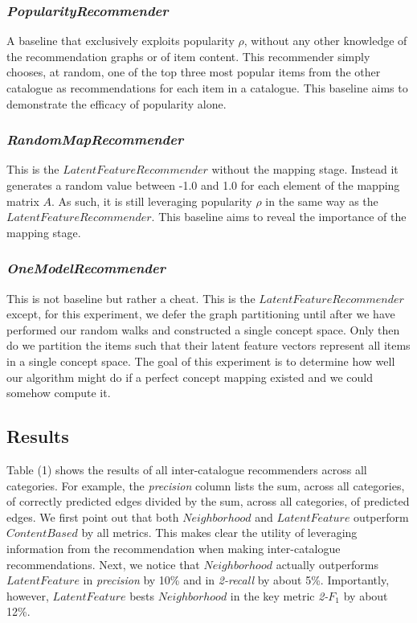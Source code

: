 \documentclass[11pt]{article}
\begin{document}
\subsubsection*{\em PopularityRecommender}
A baseline that exclusively exploits popularity $\rho$, without any other
knowledge of the recommendation graphs or of item content. This recommender
simply chooses, at random, one of the top three most popular items from the
other catalogue as recommendations for each item in a catalogue. This baseline
aims to demonstrate the efficacy of popularity alone.

\subsubsection*{\em RandomMapRecommender}
This is the $LatentFeatureRecommender$ without the mapping stage. Instead it
generates a random value between -1.0 and 1.0 for each element of the mapping
matrix $A$. As such, it is still leveraging popularity $\rho$ in the same way as
the $LatentFeatureRecommender$. This baseline aims to reveal the importance of
the mapping stage.

\subsubsection*{\em OneModelRecommender}
This is not baseline but rather a cheat. This is the $LatentFeatureRecommender$
except, for this experiment, we defer the graph partitioning until after we have
performed our random walks and constructed a single concept space. Only then do
we partition the items such that their latent feature vectors represent all
items in a single concept space. The goal of this experiment is to determine how
well our algorithm might do if a perfect concept mapping existed and we could
somehow compute it.

\pagebreak
\subsection*{Results}
Table (1) shows the results of all inter-catalogue recommenders across all
categories. For example, the {\em precision} column lists the sum, across all
categories, of correctly predicted edges divided by the sum, across all
categories, of predicted edges. We first point out that both $Neighborhood$ and
$LatentFeature$ outperform $ContentBased$ by all metrics. This makes clear the
utility of leveraging information from the recommendation when making
inter-catalogue recommendations. Next, we notice that $Neighborhood$ actually
outperforms $LatentFeature$ in {\em precision} by 10\% and in {\em 2-recall} by
about 5\%. Importantly, however, $LatentFeature$ bests $Neighborhood$ in the key
metric {\em 2-}$F_1$ by about 12\%.
\end{document}

